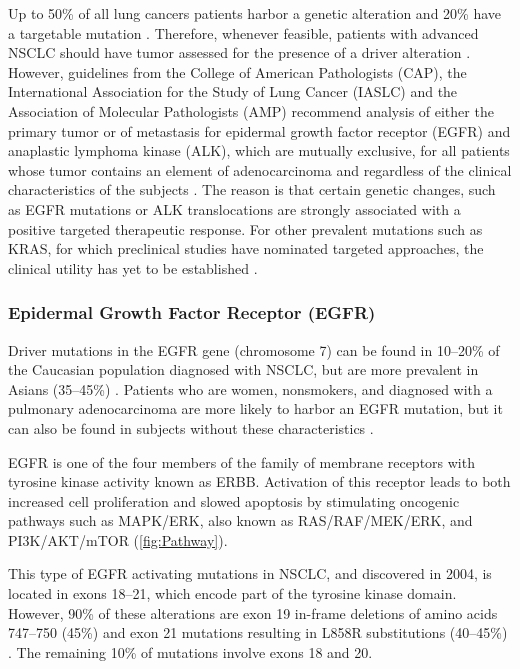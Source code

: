 Up to 50\% of all lung cancers patients harbor a genetic alteration and 20\% have a targetable mutation \cite{NSCLC_profiling}. Therefore, whenever feasible, patients with advanced NSCLC should have tumor assessed for the presence of a driver alteration \cite{Mol_guideline_1}. However, guidelines from the College of American Pathologists (CAP), the International Association for the Study of Lung Cancer (IASLC) and the Association of Molecular Pathologists (AMP) recommend analysis of either the primary tumor or of metastasis for epidermal growth factor receptor (EGFR) and anaplastic lymphoma kinase (ALK), which are mutually exclusive, for all patients whose tumor contains an element of adenocarcinoma and regardless of the clinical characteristics of the subjects \cite{Mol_guideline_1, Mol_guideline_2}. The reason is that certain genetic changes, such as EGFR mutations or ALK translocations are strongly associated with a positive targeted therapeutic response. For other prevalent mutations such as KRAS, for which preclinical studies have nominated targeted approaches, the clinical utility has yet to be established \cite{KRAS}.

\subsubsection{Epidermal Growth Factor Receptor (EGFR)}

Driver mutations in the EGFR gene (chromosome 7) can be found in 10–20\% of the Caucasian population diagnosed with NSCLC, but are more prevalent in Asians (35–45\%) \cite{AD_drivers, AD_asian}. Patients who are women, nonsmokers, and diagnosed with a pulmonary adenocarcinoma are more likely to harbor an EGFR mutation, but it can also be found in subjects without these characteristics \cite{Mol_bio}.

EGFR is one of the four members of the family of membrane receptors with tyrosine kinase activity known as ERBB. Activation of this receptor leads to both increased cell proliferation and slowed apoptosis by stimulating oncogenic pathways such as MAPK\slash ERK, also known as RAS\slash RAF\slash MEK\slash ERK, and PI3K\slash AKT\slash mTOR (\autoref{fig:Pathway}).

This type of EGFR activating mutations in NSCLC, and discovered in 2004, is located in exons 18–21, which encode part of the tyrosine kinase domain. However, 90\% of these alterations are exon 19 in-frame deletions of amino acids 747–750 (45\%) and exon 21 mutations resulting in L858R substitutions (40–45\%) \cite{EGFR}. The remaining 10\% of mutations involve exons 18 and 20.

